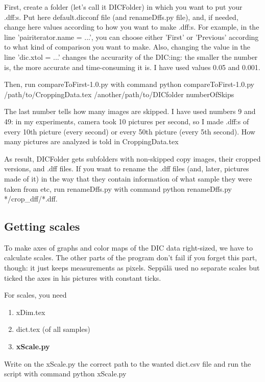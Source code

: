 \documentclass[a4paper]{article}
\begin{document}
First, create a folder (let's call it DICFolder) in which you want to put your 
.dff:s. Put here default.dicconf file (and renameDffs.py file), and, if needed, 
change here values according to how you want to make .dff:s. For example, in the 
line 'pairiterator.name = ...', you can choose either 'First' or 'Previous' 
according to what kind of comparison you want to make. Also, changing the value in 
the line 'dic.xtol = ...' changes the accurarity of the DIC:ing: the smaller the 
number is, the more accurate and time-consuming it is. I have used values 0.05 
and 0.001.

Then, run compareToFirst-1.0.py with command 
\textsf{python compareToFirst-1.0.py /path/to/CroppingData.tex /another/path/to/DICfolder numberOfSkips}

The last number tells how many images are skipped. I have used numbers 9 and 49: 
in my experiments, camera took 10 pictures per second, so I made .dff:s of every 
10th picture (every second) or every 50th picture (every 5th second). How many 
pictures are analyzed is told in CroppingData.tex

As result, DICFolder gets subfolders with non-skipped copy images, their cropped 
versions, and .dff files. If you want to rename the .dff files (and, later, 
pictures made of it) in the way that they contain information of what sample they 
were taken from etc, run renameDffs.py with command 
\textsf{python renameDffs.py */crop\_dff/*.dff}.

\subsection{Getting scales}

To make axes of graphs and color maps of the DIC data right-sized, we have to 
calculate scales. The other parts of the program don't fail if you forget this 
part, though: it just keeps measurements as pixels. Sepp\"{a}l\"{a} used no 
separate scales but ticked the axes in his pictures with constant ticks.

For scales, you need

\begin{enumerate}
\item xDim.tex
\item dict.tex (of all samples)
\item \textbf{xScale.py}
\end{enumerate}

Write on the xScale.py the correct path to the wanted dict.csv file and run 
the script with command \textsf{python xScale.py}
\end{document}
